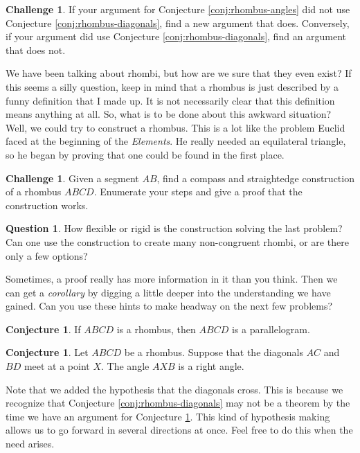 \documentclass{tufte-handout}
\theoremstyle{definition}
\newtheorem{conjecture}[problem]{Conjecture}
\newtheorem{question}[problem]{Question}
\newtheorem{challenge}[problem]{Challenge}
\begin{document}
\begin{challenge}\label{conj:rhombus-angles-redo} If your argument for Conjecture \ref{conj:rhombus-angles} did not use Conjecture \ref{conj:rhombus-diagonals}, find a new argument that does. Conversely, if your argument did use Conjecture \ref{conj:rhombus-diagonals}, find an argument that does not.
\end{challenge}


We have been talking about rhombi, but how are we sure that they even exist? If this seems a silly question, keep in mind that a rhombus is just described by a funny definition that I made up. It is not necessarily clear that this definition means anything at all. So, what is to be done about this awkward situation?  Well, we could try to construct a rhombus. This is a lot like the problem Euclid faced at the beginning of the \emph{Elements}. He really needed an equilateral triangle, so he began by proving that one could be found in the first place.

\begin{challenge}\label{prob:rhombus-construct}
Given a segment $AB$, find a compass and straightedge construction of a rhombus $ABCD$. Enumerate your steps and give a proof that the construction works.
\end{challenge}

\begin{question}\label{prob:rhombus-flexible}
How flexible or rigid is the construction solving the last problem? Can one use the construction to create many non-congruent rhombi, or are there only a few options?
\end{question}

Sometimes, a proof really has more information in it than you think. Then we can get a \emph{corollary} by digging a little deeper into the understanding we have gained.  Can you use these hints to make headway on the next few problems?

\begin{conjecture}\label{conj:rhombus-is-parallelogram}
If $ABCD$ is a rhombus, then $ABCD$ is a parallelogram.
\end{conjecture}


\begin{conjecture}\label{conj:rhombus-diagonals-angle}
Let $ABCD$ be a rhombus. Suppose that the diagonals $AC$ and $BD$ meet at a point $X$. The angle $AXB$ is a right angle.
\end{conjecture}

Note that we added the hypothesis that the diagonals cross. This is because we recognize that Conjecture \ref{conj:rhombus-diagonals} may not be a theorem by the time we have an argument for Conjecture \ref{conj:rhombus-diagonals-angle}. This kind of hypothesis making allows us to go forward in several directions at once. Feel free to do this when the need arises.
\end{document}
